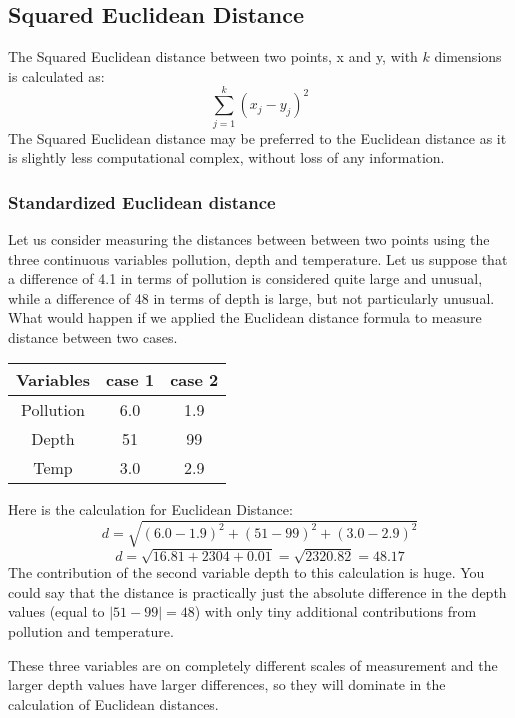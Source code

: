 \documentclass[12pt]{article}
\begin{document}
\subsection{Squared Euclidean Distance}
The Squared Euclidean distance between two points, x and y, with $k$ dimensions is calculated as:
\[ \sum^{k}_{j=1} ( x_j - y_j)^2  \]
The Squared Euclidean distance may be preferred to the Euclidean distance as it is slightly less computational complex, without loss of any information.

\newpage
\subsubsection{{\large Standardized Euclidean distance}}

Let us consider measuring the distances between between two points using
the three continuous variables pollution, depth and temperature. Let us suppose that a difference of 4.1 in terms of pollution is considered quite large and unusual, while a difference of 48 in terms of depth is large, but not particularly unusual.
What would happen if we applied the Euclidean distance formula to measure distance between two cases.
\begin{center}
	\begin{tabular}{|c|c|c|}
		\hline
		Variables & case 1 & case 2 \\ \hline 
		Pollution & 6.0 & 1.9 \\
		Depth & 51 & 99 \\
		Temp & 3.0 & 2.9 \\
		\hline
	\end{tabular}
\end{center}

\noindent Here is the calculation for Euclidean Distance:
\[ d = \sqrt{(6.0 - 1.9)^2 + (51 - 99)^2 + (3.0 - 2.9)^2}   \]
\[ d = \sqrt{16.81 + 2304 + 0.01} = \sqrt{2320.82} = 48.17 \]
\noindent The contribution of the second variable depth to this calculation is huge. You could say
that the distance is practically just the absolute difference in the depth values (equal to
$|51-99| = 48$) with only tiny additional contributions from pollution and temperature. 


These three variables are on
completely different scales of measurement and the larger depth values have larger differences, so they will dominate in the calculation of Euclidean distances.
\newpage
\end{document}

